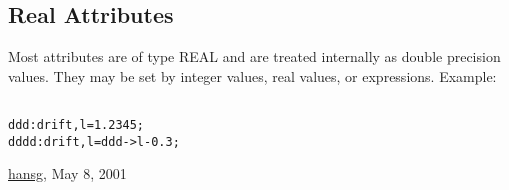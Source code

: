 




\subsection{Real Attributes}
  Most attributes are of type REAL and are treated internally as double precision values. They may be set by integer values, real values,  or expressions. Example: 
\begin{verbatim}

ddd:drift,l=1.2345;
dddd:drift,l=ddd->l-0.3;
\end{verbatim}\href{http://www.cern.ch/Hans.Grote/hansg_sign.html}{hansg}, May 8, 2001 

